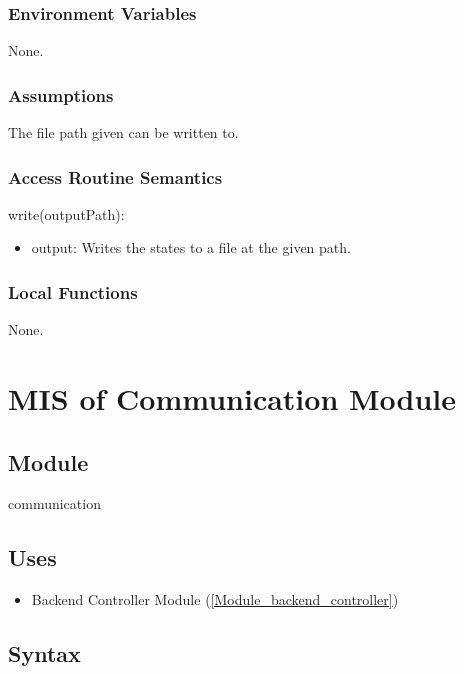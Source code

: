 \documentclass[12pt, titlepage]{article}
\begin{document}
\subsubsection{Environment Variables}

None.

\subsubsection{Assumptions}

The file path given can be written to.

\subsubsection{Access Routine Semantics}

\noindent write(outputPath):
\begin{itemize}
\item output: Writes the states to a file at the given path.
\end{itemize}

\subsubsection{Local Functions}

None.

\newpage

\section{MIS of Communication Module} \label{Module_communication}

\subsection{Module}

communication

\subsection{Uses}

\begin{itemize}
  \item Backend Controller Module (\ref{Module_backend_controller})
\end{itemize}

\subsection{Syntax}
\end{document}
